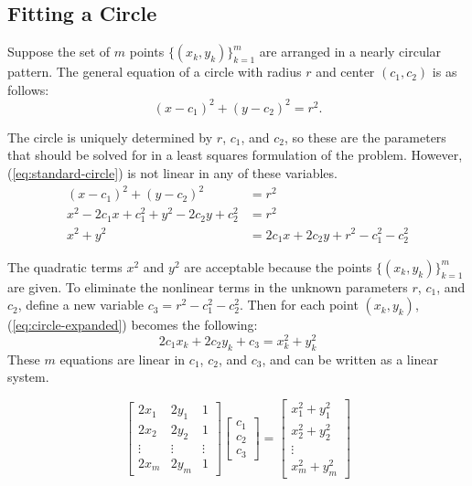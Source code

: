 \subsection*{Fitting a Circle} %

Suppose the set of $m$ points $\{(x_k, y_k)\}_{k=1}^m$ are arranged in a nearly circular pattern.
The general equation of a circle with radius $r$ and center $(c_1, c_2)$ is as follows:
\begin{equation}
(x-c_1)^2 + (y-c_2)^2 = r^2.
\label{eq:standard-circle}
\end{equation}

The circle is uniquely determined  by $r$, $c_1$, and $c_2$, so these are the parameters that should be solved for in a least squares formulation of the problem.
However, (\ref{eq:standard-circle}) is not linear in any of these variables.
%
\begin{align}
\nonumber (x - c_1)^2 + (y - c_2)^2 &= r^2 \\
\nonumber x^2 - 2c_1 x + c_1^2 + y^2 - 2c_2y + c_2^2 &= r^2 \\
x^2 + y^2 & = 2c_1 x + 2c_2 y + r^2 - c_1^2 - c_2^2
\label{eq:circle-expanded}
\end{align}

The quadratic terms $x^2$ and $y^2$ are acceptable because the points $\{(x_k, y_k)\}_{k=1}^m$ are given.
To eliminate the nonlinear terms in the unknown parameters $r$, $c_1$, and $c_2$, define a new variable $c_3 = r^2 - c_1^2 - c_2^2$.
Then for each point $(x_k, y_k)$, (\ref{eq:circle-expanded}) becomes the following:
\[2c_1x_k + 2c_2y_k + c_3 = x_k^2 + y_k^2\]
These $m$ equations are linear in $c_1$, $c_2$, and $c_3$, and can be written as a linear system.

\begin{equation}
\left[\begin{array}{ccc}
2 x_1 & 2 y_1 & 1 \\
2 x_2 & 2 y_2 & 1 \\
\vdots & \vdots & \vdots \\
2 x_m & 2 y_m & 1
\end{array}\right]
\left[\begin{array}{c} c_1 \\ c_2 \\ c_3 \end{array}\right]
=
\left[\begin{array}{c}
x_1^2 + y_1^2 \\
x_2^2 + y_2^2 \\
\vdots \\
x_m^2 + y_m^2
\end{array}\right]
\label{eq:circle-least-squares}
\end{equation}

